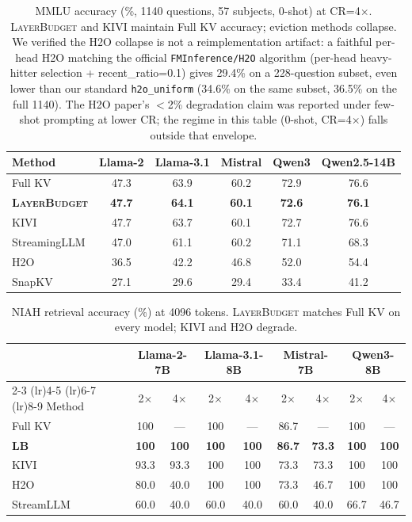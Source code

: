 \documentclass{article}
\newcommand{\layerbudget}{\textsc{LayerBudget}\xspace}
\begin{document}
\begin{table}[h]
\centering
\caption{MMLU accuracy (\%, 1140 questions, 57 subjects, 0-shot) at CR=4$\times$.  \layerbudget and KIVI maintain Full KV accuracy; eviction methods collapse.
We verified the H2O collapse is not a reimplementation artifact: a faithful per-head H2O matching the official \texttt{FMInference/H2O} algorithm (per-head heavy-hitter selection + recent\_ratio=0.1) gives 29.4\% on a 228-question subset, even lower than our standard \texttt{h2o\_uniform} (34.6\% on the same subset, 36.5\% on the full 1140).
The H2O paper's $<$2\% degradation claim was reported under few-shot prompting at lower CR; the regime in this table (0-shot, CR=4$\times$) falls outside that envelope.}
\label{tab:mmlu}
\small
\begin{tabular}{@{}lccccc@{}}
\toprule
Method & Llama-2 & Llama-3.1 & Mistral & Qwen3 & Qwen2.5-14B \\
\midrule
Full KV        & 47.3 & 63.9 & 60.2 & 72.9 & 76.6 \\
\textbf{\layerbudget} & \textbf{47.7} & \textbf{64.1} & \textbf{60.1} & \textbf{72.6} & \textbf{76.1} \\
KIVI           & 47.7 & 63.7 & 60.1 & 72.7 & 76.6 \\
StreamingLLM   & 47.0 & 61.1 & 60.2 & 71.1 & 68.3 \\
H2O            & 36.5 & 42.2 & 46.8 & 52.0 & 54.4 \\
SnapKV         & 27.1 & 29.6 & 29.4 & 33.4 & 41.2 \\
\bottomrule
\end{tabular}
\end{table}

\begin{table}[h]
\centering
\caption{NIAH retrieval accuracy (\%) at 4096 tokens.  \layerbudget matches Full KV on every model; KIVI and H2O degrade.}
\label{tab:niah}
\small
\begin{tabular}{@{}lcccccccc@{}}
\toprule
& \multicolumn{2}{c}{Llama-2-7B} & \multicolumn{2}{c}{Llama-3.1-8B} & \multicolumn{2}{c}{Mistral-7B} & \multicolumn{2}{c}{Qwen3-8B} \\
\cmidrule(lr){2-3} \cmidrule(lr){4-5} \cmidrule(lr){6-7} \cmidrule(lr){8-9}
Method & 2$\times$ & 4$\times$ & 2$\times$ & 4$\times$ & 2$\times$ & 4$\times$ & 2$\times$ & 4$\times$ \\
\midrule
Full KV     & 100 & --- & 100 & --- & 86.7 & --- & 100 & --- \\
\textbf{LB} & \textbf{100} & \textbf{100} & \textbf{100} & \textbf{100} & \textbf{86.7} & \textbf{73.3} & \textbf{100} & \textbf{100} \\
KIVI        & 93.3 & 93.3 & 100 & 100 & 73.3 & 73.3 & 100 & 100 \\
H2O         & 80.0 & 40.0 & 100 & 100 & 73.3 & 46.7 & 100 & 100 \\
StreamLLM   & 60.0 & 40.0 & 60.0 & 40.0 & 60.0 & 40.0 & 66.7 & 46.7 \\
\bottomrule
\end{tabular}
\end{table}
\end{document}
